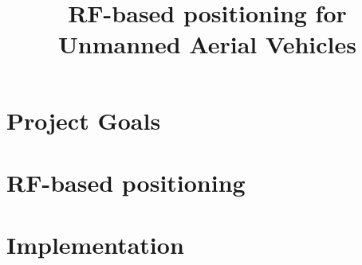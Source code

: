 \documentclass[12pt,oneside,a4paper,english]{article}
\title{RF-based positioning for Unmanned Aerial Vehicles} %
\begin{document}


\newpage
\doublespacing
\renewcommand{\baselinestretch}{1}\normalsize
\tableofcontents
\renewcommand{\baselinestretch}{1}\normalsize
\thispagestyle{fancy} %

\newpage
{}

\section{Project Goals} \label{ch1}


\newpage

\section{RF-based positioning} \label{ch2}


\section{Implementation} \label{ch3}


\label{EndOfText}

\newpage
{}



\label{endOfDoc}
\end{document}
